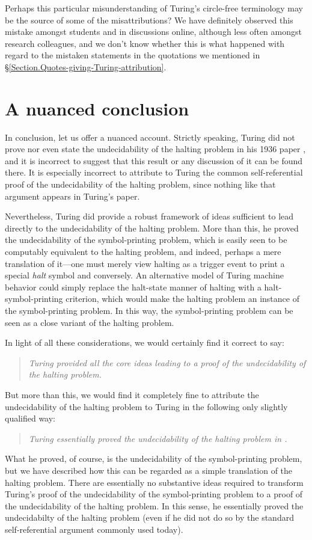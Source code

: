 \documentclass[12pt]{amsart}
\begin{document}
Perhaps this particular misunderstanding of Turing's circle-free terminology may be the source of some of the misattributions? We have definitely observed this mistake amongst students and in discussions online, although less often amongst research colleagues, and we don't know whether this is what happened with regard to the mistaken statements in the quotations we mentioned in \S\ref{Section.Quotes-giving-Turing-attribution}.

\section{A nuanced conclusion}

In conclusion, let us offer a nuanced account. Strictly speaking, Turing did not prove nor even state the undecidability of the halting problem in his 1936 paper \cite{Turing1936:On-computable-numbers}, and it is incorrect to suggest that this result or any discussion of it can be found there. It is especially incorrect to attribute to Turing \cite{Turing1936:On-computable-numbers} the common self-referential proof of the undecidability of the halting problem, since nothing like that argument appears in Turing's paper. 

Nevertheless, Turing did provide a robust framework of ideas sufficient to lead directly to the undecidability of the halting problem. More than this, he proved the undecidability of the symbol-printing problem, which is easily seen to be computably equivalent to the halting problem, and indeed, perhaps a mere translation of it---one must merely view halting as a trigger event to print a special \emph{halt} symbol and conversely. An alternative model of Turing machine behavior could simply replace the halt-state manner of halting with a halt-symbol-printing criterion, which would make the halting problem an instance of the symbol-printing problem. In this way, the symbol-printing problem can be seen as a close variant of the halting problem.\goodbreak

In light of all these considerations, we would certainly find it correct to say:
\begin{quote}\it
Turing \cite{Turing1936:On-computable-numbers} provided all the core ideas leading to a proof of the undecidability of the halting problem.
\end{quote}
But more than this, we would find it completely fine to attribute the undecidability of the halting problem to Turing in the following only slightly qualified way:
\begin{quote}\it 
Turing essentially proved the undecidability of the halting problem in \cite{Turing1936:On-computable-numbers}.
\end{quote}
What he proved, of course, is the undecidability of the symbol-printing problem, but we have described how this can be regarded as a simple translation of the halting problem. There are essentially no substantive ideas required to transform Turing's proof of the undecidability of the symbol-printing problem to a proof of the undecidability of the halting problem. In this sense, he essentially proved the undecidabilty of the halting problem (even if he did not do so by the standard self-referential argument commonly used today).
\end{document}
